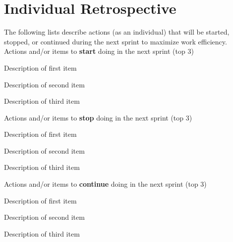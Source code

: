 \documentclass{article}
\begin{document}
\pagebreak

\section{Individual Retrospective}
The following lists describe actions (as an individual) that will be started, stopped, or continued during the next sprint to maximize work efficiency. \\

Actions and/or items to \textbf{start} doing in the next sprint (top 3)
\begin{itemize}
\begin{item}
Description of first item
\end{item}
\begin{item}
Description of second item
\end{item}
\begin{item}
Description of third item
\end{item}
\end{itemize}

Actions and/or items to \textbf{stop} doing in the next sprint (top 3)
\begin{itemize}
\begin{item}
Description of first item
\end{item}
\begin{item}
Description of second item
\end{item}
\begin{item}
Description of third item
\end{item}
\end{itemize}

Actions and/or items to \textbf{continue} doing in the next sprint (top 3)
\begin{itemize}
\begin{item}
Description of first item
\end{item}
\begin{item}
Description of second item
\end{item}
\begin{item}
Description of third item
\end{item}
\end{itemize}
\end{document}
